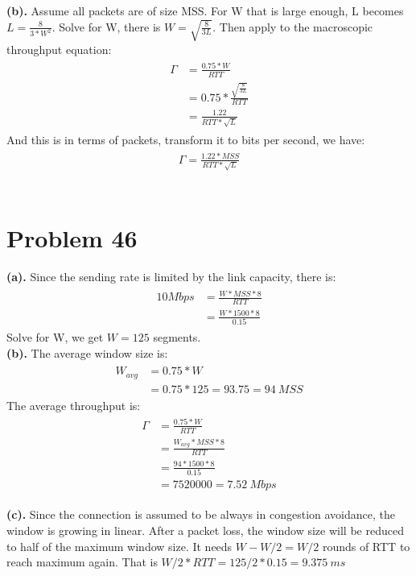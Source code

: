 \documentclass[titlepage, paper=a4, fontsize=11pt]{scrartcl} %
\numberwithin{equation}{section} %
\numberwithin{table}{section} %
\begin{document}
\textbf{(b).}
Assume all packets are of size MSS. For W that is large enough, L becomes $L=\frac{8}{3*W^2}$.
Solve for W, there is $W=\sqrt{\frac{8}{3L}}$. Then apply to the macroscopic throughput equation:
\begin{align*} 
\begin{split}
\Gamma &= \frac{0.75*W}{RTT} \\
&= 0.75 * \frac{\sqrt{\frac{8}{3L}}}{RTT} \\
&= \frac{1.22}{RTT*\sqrt{L}}
\end{split}					
\end{align*}
And this is in terms of packets, transform it to bits per second, we have:
\begin{align*} 
\begin{split}
\Gamma = \frac{1.22*MSS}{RTT*\sqrt{L}}
\end{split}					
\end{align*}
\\



\section*{Problem 46}
\textbf{(a).}
Since the sending rate is limited by the link capacity, there is:
\begin{align*} 
\begin{split}
10 Mbps &= \frac{W*MSS*8}{RTT} \\
&= \frac{W*1500*8}{0.15}
\end{split}					
\end{align*}
Solve for W, we get $W=125$ segments. \\

\textbf{(b).}
The average window size is:
\begin{align*} 
\begin{split}
W_{avg} &= 0.75*W \\
&= 0.75* 125 = 93.75 = 94\ MSS
\end{split}					
\end{align*}
The average throughput is:
\begin{align*} 
\begin{split}
\Gamma &= \frac{0.75*W}{RTT} \\
&= \frac{W_{avg}*MSS*8}{RTT} \\
&= \frac{94*1500*8}{0.15} \\
&= 7520000 = 7.52 \ Mbps
\end{split}					
\end{align*}

\textbf{(c).}
Since the connection is assumed to be always in congestion avoidance, the window is growing in linear.
After a packet loss, the window size will be reduced to half of the maximum window size.
It needs $W-W/2=W/2$ rounds of RTT to reach maximum again. That is $W/2*RTT=125/2*0.15=9.375 \ ms$
\\
\end{document}
